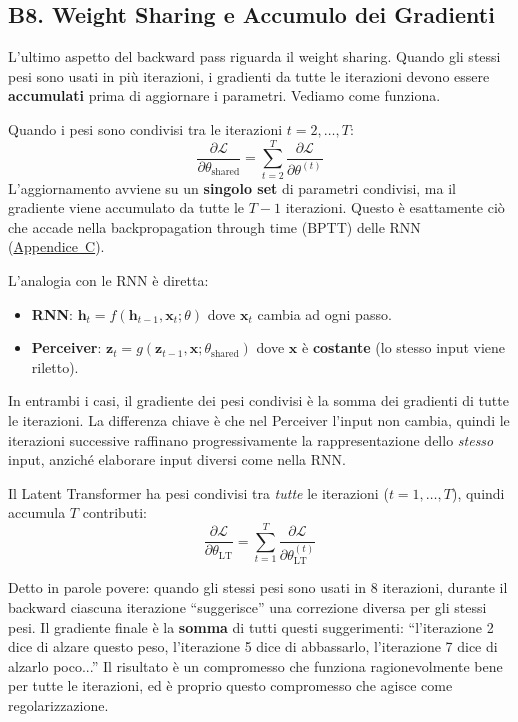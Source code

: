 \documentclass[12pt,a4paper]{article}
\begin{document}
\subsection{B8. Weight Sharing e Accumulo dei Gradienti} \label{sec:grad_ws}

L'ultimo aspetto del backward pass riguarda il weight sharing. Quando gli stessi pesi sono usati in pi\`u iterazioni, i gradienti da tutte le iterazioni devono essere \textbf{accumulati} prima di aggiornare i parametri. Vediamo come funziona.

\begin{formulabox}
Quando i pesi sono condivisi tra le iterazioni $t = 2, \ldots, T$:
\[
    \frac{\partial \mathcal{L}}{\partial \theta_{\text{shared}}} = \sum_{t=2}^{T} \frac{\partial \mathcal{L}}{\partial \theta^{(t)}}
\]
L'aggiornamento avviene su un \textbf{singolo set} di parametri condivisi, ma il gradiente viene accumulato da tutte le $T-1$ iterazioni. Questo \`e esattamente ci\`o che accade nella backpropagation through time (BPTT) delle RNN (\hyperref[app:rnn]{Appendice~C}).
\end{formulabox}

\begin{notabox}
L'analogia con le RNN \`e diretta:
\begin{itemize}
    \item \textbf{RNN}: $\mathbf{h}_t = f(\mathbf{h}_{t-1}, \mathbf{x}_t; \theta)$ dove $\mathbf{x}_t$ cambia ad ogni passo.
    \item \textbf{Perceiver}: $\mathbf{z}_t = g(\mathbf{z}_{t-1}, \mathbf{x}; \theta_{\text{shared}})$ dove $\mathbf{x}$ \`e \textbf{costante} (lo stesso input viene riletto).
\end{itemize}
In entrambi i casi, il gradiente dei pesi condivisi \`e la somma dei gradienti di tutte le iterazioni. La differenza chiave \`e che nel Perceiver l'input non cambia, quindi le iterazioni successive raffinano progressivamente la rappresentazione dello \emph{stesso} input, anzich\'e elaborare input diversi come nella RNN.

Il Latent Transformer ha pesi condivisi tra \emph{tutte} le iterazioni ($t = 1, \ldots, T$), quindi accumula $T$ contributi:
\[
    \frac{\partial \mathcal{L}}{\partial \theta_{\text{LT}}} = \sum_{t=1}^{T} \frac{\partial \mathcal{L}}{\partial \theta_{\text{LT}}^{(t)}}
\]
\end{notabox}

\begin{notabox}
Detto in parole povere: quando gli stessi pesi sono usati in 8 iterazioni, durante il backward ciascuna iterazione ``suggerisce'' una correzione diversa per gli stessi pesi. Il gradiente finale \`e la \textbf{somma} di tutti questi suggerimenti: ``l'iterazione 2 dice di alzare questo peso, l'iterazione 5 dice di abbassarlo, l'iterazione 7 dice di alzarlo poco...'' Il risultato \`e un compromesso che funziona ragionevolmente bene per tutte le iterazioni, ed \`e proprio questo compromesso che agisce come regolarizzazione.
\end{notabox}
\end{document}
